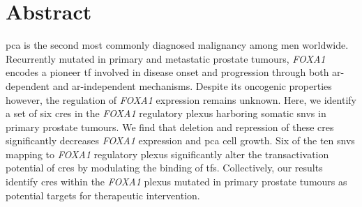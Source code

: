 \section{Abstract}

\Gls{pca} is the second most commonly diagnosed malignancy among men worldwide.
Recurrently mutated in primary and metastatic prostate tumours, \emph{FOXA1} encodes a pioneer \gls{tf} involved in disease onset and progression through both \gls{ar}-dependent and \gls{ar}-independent mechanisms.
Despite its oncogenic properties however, the regulation of \emph{FOXA1} expression remains unknown.
Here, we identify a set of six \glspl{cre} in the \emph{FOXA1} regulatory plexus harboring somatic \glspl{snv} in primary prostate tumours.
We find that deletion and repression of these \glspl{cre} significantly decreases \emph{FOXA1} expression and \gls{pca} cell growth.
Six of the ten \glspl{snv} mapping to \emph{FOXA1} regulatory plexus significantly alter the transactivation potential of \glspl{cre} by modulating the binding of \glspl{tf}.
Collectively, our results identify \glspl{cre} within the \emph{FOXA1} plexus mutated in primary prostate tumours as potential targets for therapeutic intervention.
